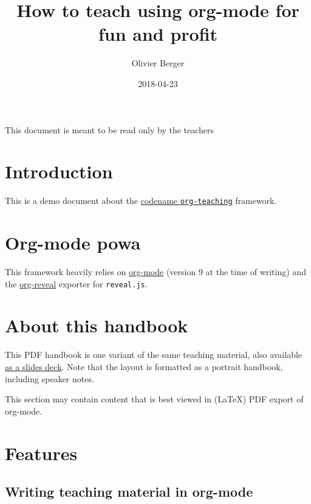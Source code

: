 \documentclass[a4paper]{article}
\author{Olivier Berger}
\date{2018-04-23}
\title{How to teach using org-mode for fun and profit}
\begin{document}
\maketitle
\setcounter{tocdepth}{2}
\tableofcontents

\begin{ABSTRACT}
\begin{shaded}
This document is meant to be read only by the teachers
\end{shaded}
\end{ABSTRACT}



\section{Introduction}
\label{sec:orgd3f4f85}

This is a demo document about the
\href{http://www-public.tem-tsp.eu/\~berger\_o/org-teaching/}{codename \texttt{org-teaching}} framework.

\section{Org-mode powa}
\label{sec:org5128d4d}

This framework heavily relies on \href{http://orgmode.org/}{org-mode} (version 9 at the time of writing) and the \href{https://github.com/yjwen/org-reveal/}{org-reveal} exporter for \texttt{reveal.js}.

\section{About this handbook}
\label{sec:orgbc9bcbe}

This PDF handbook is one variant of the same teaching material, also
available \href{./slides.html}{as a slides deck}. Note that the layout is
formatted as a portrait handbook, including speaker notes.

This section may contain content that is best viewed in (\LaTeX{}) PDF export of org-mode.

\section{Features}
\label{sec:orgf9229a4}
\subsection{Writing teaching material in org-mode}
\label{sec:org36c7ed9}
\end{document}

